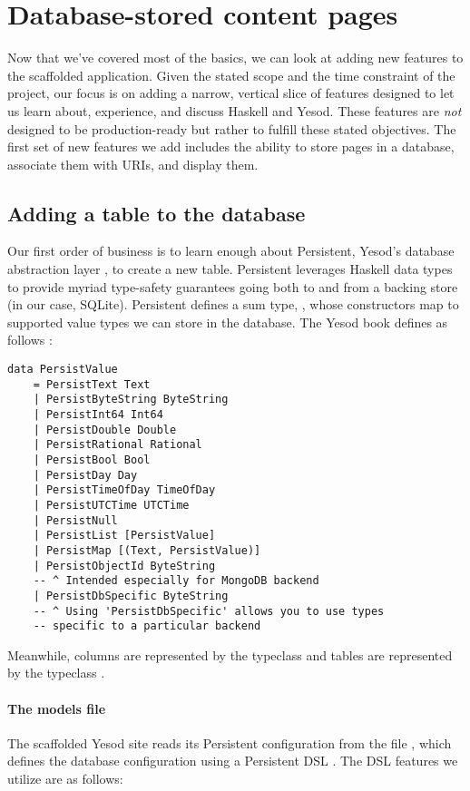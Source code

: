 \section{Database-stored content pages}

Now that we've covered most of the basics, we can look at adding new features to the scaffolded application. Given the stated scope and the time constraint of the project, our focus is on adding a narrow, vertical slice of features designed to let us learn about, experience, and discuss Haskell and Yesod. These features are \emph{not} designed to be production-ready but rather to fulfill these stated objectives. The first set of new features we add includes the ability to store pages in a database, associate them with URIs, and display them.

\subsection{Adding a table to the database}

Our first order of business is to learn enough about Persistent, Yesod's database abstraction layer \cite{ybkPersistent}, to create a new table. Persistent leverages Haskell data types to provide myriad type-safety guarantees going both to and from a backing store (in our case, SQLite). Persistent defines a sum type, , whose constructors map to supported value types we can store in the database. The Yesod book defines  as follows \cite{ybkPersistent}:

\begin{Verbatim}
data PersistValue
    = PersistText Text
    | PersistByteString ByteString
    | PersistInt64 Int64
    | PersistDouble Double
    | PersistRational Rational
    | PersistBool Bool
    | PersistDay Day
    | PersistTimeOfDay TimeOfDay
    | PersistUTCTime UTCTime
    | PersistNull
    | PersistList [PersistValue]
    | PersistMap [(Text, PersistValue)]
    | PersistObjectId ByteString
    -- ^ Intended especially for MongoDB backend
    | PersistDbSpecific ByteString
    -- ^ Using 'PersistDbSpecific' allows you to use types
    -- specific to a particular backend
\end{Verbatim}

Meanwhile, columns are represented by the  typeclass and tables are represented by the  typeclass \cite{ybkPersistent}.

\paragraph{The models file} The scaffolded Yesod site reads its Persistent configuration from the file , which defines the database configuration using a Persistent DSL \cite{ybkScaffolding}. The DSL features we utilize are as follows:

